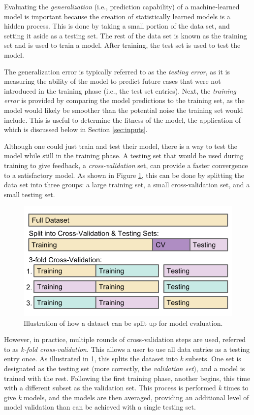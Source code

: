 Evaluating the \textit{generalization} (i.e., prediction capability) of a
machine-learned model is important because the creation of statistically
learned models is a hidden process. This is done by taking a small portion of
the data set, and setting it aside as a testing set.  The rest of the data set
is known as the training set and is used to train a model. After training, the
test set is used to test the model.  

The generalization error is typically referred to as the \textit{testing
error}, as it is measuring the ability of the model to predict future cases
that were not introduced in the training phase (i.e., the test set entries).
Next, the \textit{training error} is provided by comparing the model
predictions to the training set, as the model would likely be smoother than the
potential noise the training set would include. This is useful to determine the
fitness of the model, the application of which is discussed below in Section
\ref{sec:inputs}.

Although one could just train and test their model, there is a way to test the
model while still in the training phase. A testing set that would be used
during training to give feedback, a \textit{cross-validation} set, can provide
a faster convergence to a satisfactory model. As shown in Figure
\ref{fig:cverror}, this can be done by splitting the data set into three
groups: a large training set, a small cross-validation set, and a small testing
set. 

\begin{figure}[!htb]
  \includegraphics[width=\linewidth]{./chapters/litrev/cverror.png}
  \caption{Illustration of how a dataset can be split up for model evaluation.}
  \label{fig:cverror}
\end{figure}

However, in practice, multiple rounds of cross-validation steps are used,
referred to as \textit{k-fold cross-validation}. This allows a user to use all
data entries as a testing entry once.  As illustrated in \ref{fig:cverror},
this splits the dataset into \textit{k} subsets. One set is designated as the
testing set (more correctly, the \textit{validation set}), and a model is
trained with the rest. Following the first training phase, another begins, this
time with a different subset as the validation set.  This process is performed
\textit{k} times to give \textit{k} models, and the models are then averaged,
providing an additional level of model validation than can be achieved with a
single testing set.

